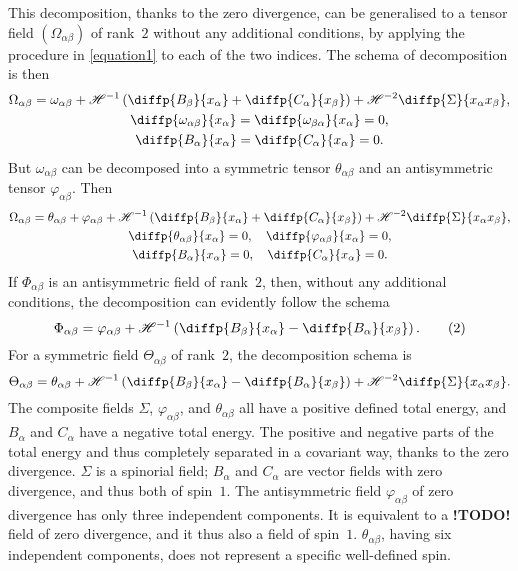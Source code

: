 \documentclass{article}
\newcommand{\HH}{\mathscr{H}}
\newcommand{\todo}{\textbf{ !TODO! }}
\newcommand{\oldpage}[1]{\marginpar{\footnotesize$\Big\vert$ \textit{p.~#1}}}
\begin{document}
This decomposition, thanks to the zero divergence, can be generalised to a tensor field $(\Omega_{\alpha\beta})$ of rank~$2$ without any additional conditions, by applying the procedure in \cref{equation1} to each of the two indices.
The schema of decomposition is then
\begin{gather*}
  \Omega_{\alpha\beta} = \omega_{\alpha\beta} + \HH^{-1}\left(
    \diffp{{B_\beta}}{{x_\alpha}} + \diffp{{C_\alpha}}{{x_\beta}}
  \right) + \HH^{-2}\diffp{\Sigma}{{{x_\alpha}}{{x_\beta}}},
\\\diffp{{\omega_{\alpha\beta}}}{{x_\alpha}} = \diffp{{\omega_{\beta\alpha}}}{{x_\alpha}} = 0,
\\\diffp{{B_\alpha}}{{x_\alpha}} = \diffp{{C_\alpha}}{{x_\alpha}} = 0.
\end{gather*}
But $\omega_{\alpha\beta}$ can be decomposed into a symmetric tensor $\theta_{\alpha\beta}$ and an antisymmetric tensor $\varphi_{\alpha\beta}$.
Then
\oldpage{13-04}
\begin{gather*}
  \Omega_{\alpha\beta} = \theta_{\alpha\beta} + \varphi_{\alpha\beta} + \HH^{-1}\left(
    \diffp{{B_\beta}}{{x_\alpha}} + \diffp{{C_\alpha}}{{x_\beta}}
  \right) + \HH^{-2}\diffp{\Sigma}{{x_\alpha}{x_\beta}},
\\\diffp{{\theta_{\alpha\beta}}}{{x_\alpha}} = 0,
  \quad \diffp{{\varphi_{\alpha\beta}}}{{x_\alpha}} = 0,
\\\diffp{{B_\alpha}}{{x_\alpha}} = 0,
  \quad \diffp{{C_\alpha}}{{x_\alpha}} = 0.
\end{gather*}
If $\Phi_{\alpha\beta}$ is an antisymmetric field of rank~$2$, then, without any additional conditions, the decomposition can evidently follow the schema
\[
\label{equation2}
  \Phi_{\alpha\beta} = \varphi_{\alpha\beta} + \HH^{-1}\left(
    \diffp{{B_\beta}}{{x_\alpha}} - \diffp{{B_\alpha}}{{x_\beta}}
  \right).
  \tag{2}
\]
For a symmetric field $\Theta_{\alpha\beta}$ of rank~$2$, the decomposition schema is
\[
  \Theta_{\alpha\beta} = \theta_{\alpha\beta} + \HH^{-1}\left(
    \diffp{{B_\beta}}{{x_\alpha}} - \diffp{{B_\alpha}}{{x_\beta}}
  \right) + \HH^{-2} \diffp{\Sigma}{{x_\alpha}{x_\beta}}.
\]
The composite fields $\Sigma$, $\varphi_{\alpha\beta}$, and $\theta_{\alpha\beta}$ all have a positive defined total energy, and $B_\alpha$ and $C_\alpha$ have a negative total energy.
The positive and negative parts of the total energy and thus completely separated in a covariant way, thanks to the zero divergence.
$\Sigma$ is a spinorial field; $B_\alpha$ and $C_\alpha$ are vector fields with zero divergence, and thus both of spin~$1$.
The antisymmetric field $\varphi_{\alpha\beta}$ of zero divergence has only three independent components.
It is equivalent to a \todo field of zero divergence, and it thus also a field of spin~$1$.
$\theta_{\alpha\beta}$, having six independent components, does not represent a specific well-defined spin.
\end{document}
